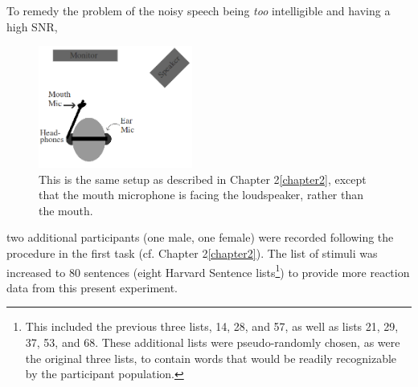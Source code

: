 \documentclass[dissertation,copyright]{uathesis}
\begin{document}
To remedy the problem of the noisy speech being \textit{too} intelligible and having a high SNR, 
%
\begin{figure}
\centering
  \includegraphics[width=0.45\textwidth]{figure/overallSetUp_new.png}
  \caption{This is the same setup as described in Chapter 2\ref{chapter2}, except that the mouth microphone is facing the loudspeaker, rather than the mouth.}
  \label{fig:overallSetUp_new}
\end{figure}
%
two additional participants (one male, one female) were recorded following the procedure in the first task (cf. Chapter 2\ref{chapter2}).  The list of stimuli was increased to 80 sentences (eight Harvard Sentence lists\footnote{This included the previous three lists, 14, 28, and 57, as well as lists 21, 29, 37, 53, and 68. These additional lists were pseudo-randomly chosen, as were the original three lists, to contain words that would be readily recognizable by the participant population.}) to provide more reaction data from this present experiment.  
\end{document}
